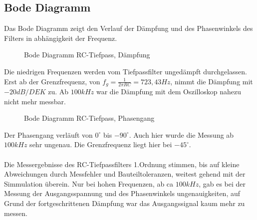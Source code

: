 \subsection{Bode Diagramm}

Das Bode Diagramm zeigt den Verlauf der Dämpfung und des Phasenwinkels des Filters in abhängigkeit der Frequenz.\\
\begin{figure}[H]
  \centering
  \caption{Bode Diagramm RC-Tiefpass, Dämpfung}
\end{figure}
\noindent
Die niedrigen Frequenzen werden vom Tiefpassfilter ungedämpft durchgelassen. Erst ab der Grenzfrequenz, von $f_g = \frac{1}{2\pi RC} = 723,43Hz$, nimmt die Dämpfung
mit $-20dB/DEK$ zu. Ab $100kHz$ war die Dämpfung mit dem Oszilloskop nahezu nicht mehr messbar. \\

\begin{figure}[H]
  \centering
  \caption{Bode Diagramm RC-Tiefpass, Phasengang}
\end{figure}
\noindent
Der Phasengang verläuft von $0^\circ$ bis $-90^\circ$. Auch hier wurde die Messung ab $100kHz$ sehr ungenau. Die Grenzfrequenz liegt hier bei $-45^\circ$.\\
\\
Die Messergebnisse des RC-Tiefpassfilters 1.Ordnung stimmen, bis auf kleine Abweichungen durch Messfehler und Bauteiltoleranzen, weitest gehend mit der Simmulation überein.
Nur bei hohen Frequenzen, ab ca $100kHz$, gab es bei der Messung der Ausgangsspannung und des Phasenwinkels ungenauigkeiten, auf Grund der fortgeschrittenen Dämpfung war das
Ausgangssignal kaum mehr zu messen. \\
